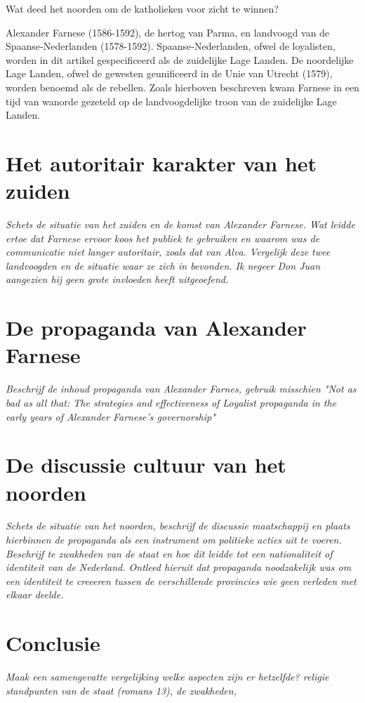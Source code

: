 \documentclass[11pt]{amsart}
\begin{document}
Wat deed het noorden om de katholieken voor zicht te winnen?


Alexander Farnese (1586-1592), de hertog van Parma, en landvoogd van de Spaanse-Nederlanden (1578-1592). Spaanse-Nederlanden, ofwel de loyalisten, worden in dit artikel gespecificeerd als de zuidelijke Lage Landen. De noordelijke Lage Landen, ofwel de gewesten geunificeerd in de Unie van Utrecht (1579), worden benoemd als de rebellen. Zoals hierboven beschreven kwam Farnese in een tijd van wanorde gezeteld op de landvoogdelijke troon van de zuidelijke Lage Landen. 




\newpage

\section{Het autoritair karakter van het zuiden}
\textit{Schets de situatie van het zuiden en de komst van Alexander Farnese. Wat leidde ertoe dat Farnese ervoor koos het
     publiek te gebruiken en waarom was de communicatie niet langer autoritair, zoals dat van Alva. Vergelijk deze twee
     landvoogden en de situatie waar ze zich in bevonden. Ik negeer Don Juan aangezien hij geen grote invloeden heeft
     uitgeoefend.}

\section{De propaganda van Alexander Farnese}
\textit{Beschrijf de inhoud propaganda van Alexander Farnes, gebruik misschien "Not as bad as all that: The strategies and effectiveness of Loyalist propaganda in the early years of Alexander Farnese's governorship"}

\section{De discussie cultuur van het noorden}
\textit{Schets de situatie van het noorden, beschrijf de discussie maatschappij en plaats hierbinnen de propaganda als een
     instrument om politieke acties uit te voeren. Beschrijf te zwakheden van de staat en hoe dit leidde tot een nationaliteit of identiteit van de Nederland. Ontleed hieruit dat propaganda noodzakelijk was om een identiteit te creeeren tussen de verschillende provincies wie geen verleden met elkaar deelde. }

\section{Conclusie}
\textit{Maak een samengevatte vergelijking welke aspecten zijn er hetzelfde? religie standpunten van de staat (romans 13), de zwakheden, }

\newpage\printbibliography{}
\end{document}
